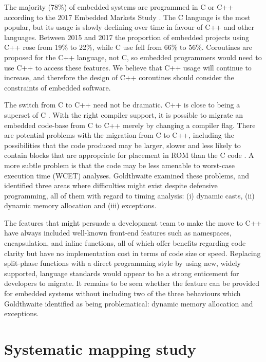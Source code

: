 The majority (78\%) of embedded systems are programmed in C or C++ according to the 2017 Embedded Markets Study \cite{AspenCore2017}. The C language is the most popular, but its usage is slowly declining over time in favour of C++ and other languages. Between 2015 and 2017 the proportion of embedded projects using C++ rose from 19\% to 22\%, while C use fell from 66\% to 56\%. Coroutines are proposed for the C++ language, not C, so embedded programmers would need to use C++ to access these features. We believe that C++ usage will continue to increase, and therefore the design of C++ coroutines should consider the constraints of embedded software.  

The switch from C to C++ need not be dramatic. C++ is close to being a superset of C \cite{Stroustrup1986}. With the right compiler support, it is possible to migrate an embedded code-base from C to C++ merely by changing a compiler flag. There are potential problems with the migration from C to C++, including the possibilities that the code produced may be larger, slower and less likely to contain blocks that are appropriate for placement in ROM than the C code \cite{Goldthwaite2006, Herity2015}. A more subtle problem is that the code may be less amenable to worst-case execution time (WCET) analyses. Goldthwaite \cite{Goldthwaite2006} examined these problems, and identified three areas where difficulties might exist despite defensive programming, all of them with regard to timing analysis: (i) dynamic casts, (ii) dynamic memory allocation and (iii) exceptions.

The features that might persuade a development team to make the move to C++ have always included well-known front-end features such as namespaces, encapsulation, and inline functions, all of which offer benefits regarding code clarity but have no implementation cost in terms of code size or speed. Replacing split-phase functions with a direct programming style by using new, widely supported, language standards would appear to be a strong enticement for developers to migrate. It remains to be seen whether the feature can be provided for embedded systems without including two of the three behaviours which Goldthwaite \cite{Goldthwaite2006} identified as being problematical: dynamic memory allocation and exceptions.

\section{Systematic mapping study}
\label{section:sms}

